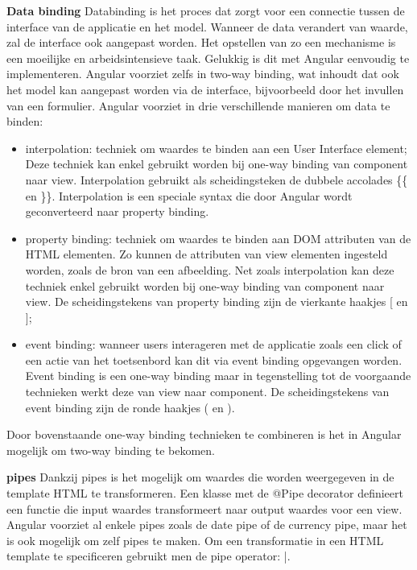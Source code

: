 \textbf{Data binding} \hspace{1cm} Databinding is het proces dat zorgt voor een connectie tussen de interface van de applicatie en het model. Wanneer de data verandert van waarde, zal de interface ook aangepast worden. Het opstellen van zo een mechanisme is een moeilijke en arbeidsintensieve taak. Gelukkig is dit met Angular eenvoudig te implementeren. Angular voorziet zelfs in two-way binding, wat inhoudt dat ook het model kan aangepast worden via de interface, bijvoorbeeld door het invullen van een formulier. Angular voorziet in drie verschillende manieren om data te binden:
\begin{itemize}
	\item interpolation: techniek om waardes te binden aan een User Interface element;
	Deze techniek kan enkel gebruikt worden bij one-way binding van component naar view. Interpolation gebruikt als scheidingsteken de dubbele accolades \{\{ en \}\}. Interpolation is een speciale syntax die door Angular wordt geconverteerd naar property binding.
	\item property binding: techniek om waardes te binden aan DOM attributen van de HTML elementen. Zo kunnen de attributen van view elementen ingesteld worden, zoals de bron van een afbeelding. Net zoals interpolation kan deze techniek enkel gebruikt worden bij one-way binding van component naar view. De scheidingstekens van property binding zijn de vierkante haakjes [ en ];
	\item event binding: wanneer users interageren met de applicatie zoals een click of een actie van het toetsenbord kan dit via event binding opgevangen worden. Event binding is een one-way binding maar in tegenstelling tot de voorgaande technieken werkt deze van view naar component. De scheidingstekens van event binding zijn de ronde haakjes ( en ). 
\end{itemize}
Door bovenstaande one-way binding technieken te combineren is het in Angular mogelijk om two-way binding te bekomen. 

\textbf{pipes} \hspace{1cm} Dankzij pipes is het mogelijk om waardes die worden weergegeven in de template HTML te transformeren. Een klasse met de @Pipe decorator definieert een functie die input waardes transformeert naar output waardes voor een view. Angular voorziet al enkele pipes zoals de date pipe of de currency pipe, maar het is ook mogelijk om zelf pipes te maken. Om een transformatie in een HTML template te specificeren gebruikt men de pipe operator: |. 

